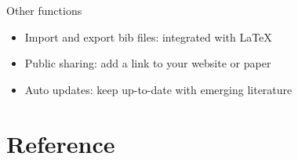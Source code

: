 \documentclass[aspectratio=43]{beamer}
\begin{document}
\begin{frame}{Other functions}
    
    \begin{itemize}
        \item Import and export bib files: integrated with \LaTeX 
        \item Public sharing: add a link to your website or paper 
        \item Auto updates: keep up-to-date with emerging literature
    \end{itemize}
\end{frame}



\section{Reference}



\end{document}
